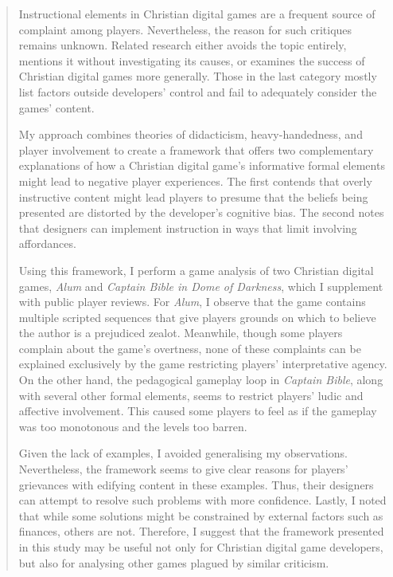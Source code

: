 
\begin{abstract}
Instructional elements in Christian digital games are a frequent source of complaint among players. Nevertheless, the reason for such critiques remains unknown. Related research either avoids the topic entirely, mentions it without investigating its causes, or examines the success of Christian digital games more generally. Those in the last category mostly list factors outside developers’ control and fail to adequately consider the games’ content. 

My approach combines theories of didacticism, heavy-handedness, and player involvement to create a framework that offers two complementary explanations of how a Christian digital game’s informative formal elements might lead to negative player experiences. The first contends that overly instructive content might lead players to presume that the beliefs being presented are distorted by the developer’s cognitive bias. The second notes that designers can implement instruction in ways that limit involving affordances.

Using this framework, I perform a game analysis of two Christian digital games, \textit{Alum} and \textit{Captain Bible in Dome of Darkness}, which I supplement with public player reviews. For \textit{Alum}, I observe that the game contains multiple scripted sequences that give players grounds on which to believe the author is a prejudiced zealot. Meanwhile, though some players complain about the game’s overtness, none of these complaints can be explained exclusively by the game restricting players’ interpretative agency. On the other hand, the pedagogical gameplay loop in \textit{Captain Bible}, along with several other formal elements, seems to restrict players’ ludic and affective involvement. This caused some players to feel as if the gameplay was too monotonous and the levels too barren.

Given the lack of examples, I avoided generalising my observations.  Nevertheless, the framework seems to give clear reasons for players' grievances with edifying content in these examples. Thus, their designers can attempt to resolve such problems with more confidence. Lastly, I noted that while some solutions might be constrained by external factors such as finances, others are not. Therefore, I suggest that the framework presented in this study may be useful not only for Christian digital game developers, but also for analysing other games plagued by similar criticism.

\end{abstract}

